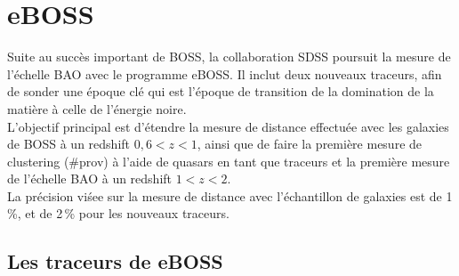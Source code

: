 \documentclass[11pt, twoside, a4paper, openright]{report}
\begin{document}
\section{eBOSS}

Suite au succès important de BOSS, la collaboration SDSS poursuit la mesure de l'échelle BAO avec le programme eBOSS. Il inclut deux nouveaux traceurs, afin de sonder une époque clé qui est l'époque de transition de la domination de la matière à celle de l'énergie noire. \\
L'objectif principal est d'étendre la mesure de distance effectuée avec les galaxies de BOSS à un redshift $0,6 < z < 1$, ainsi que de faire la première mesure de clustering (\#prov) à l'aide de quasars en tant que traceurs et la première mesure de l'échelle BAO à un redshift $1 < z < 2$. \\
La précision viśee sur la mesure de distance avec l'échantillon de galaxies est de 1\,\%, et de 2\,\% pour les nouveaux traceurs.



\subsection{Les traceurs de eBOSS}
\end{document}
